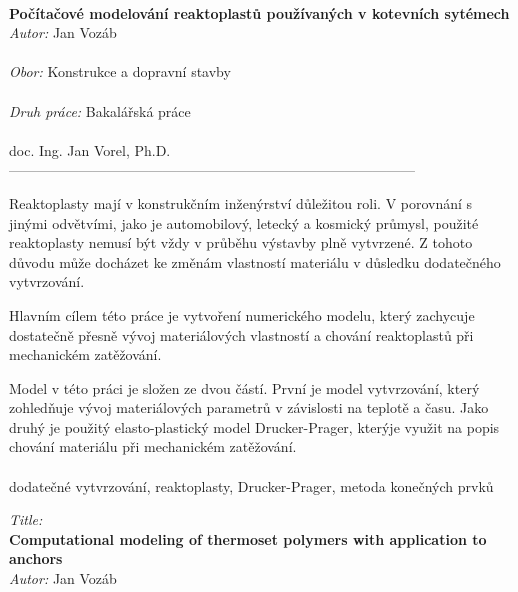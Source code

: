\thispagestyle{empty}

\\
{\bf Počítačové modelování reaktoplastů používaných v kotevních sytémech}\\

\noindent
{\it Autor:} Jan Vozáb  \\
\\
\noindent
{\it Obor:}       Konstrukce a dopravní stavby\\
\\
\noindent
{\it Druh práce:} Bakalářská práce\\
\\
 doc. Ing. Jan Vorel, Ph.D.\\   --------------------------------------------------------------------------------------- \\


Reaktoplasty mají v konstrukčním inženýrství důležitou roli. V porovnání s jinými odvětvími, jako je automobilový, letecký a kosmický průmysl, použité reaktoplasty nemusí být vždy v průběhu výstavby plně vytvrzené. Z tohoto důvodu může docházet ke změnám vlastností materiálu v důsledku dodatečného vytvrzování. 

Hlavním cílem této práce je vytvoření numerického modelu, který zachycuje dostatečně přesně vývoj materiálových vlastností a chování reaktoplastů při mechanickém zatěžování. 

Model v této práci je složen ze dvou částí. První je model vytvrzování, který zohledňuje vývoj materiálových parametrů v závislosti na teplotě a času. Jako druhý je použitý elasto-plastický model Drucker-Prager, kterýje využit na popis chování materiálu při mechanickém zatěžování.
\\
\\

 dodatečné vytvrzování, reaktoplasty, Drucker-Prager, metoda konečných prvků

 \newpage
\thispagestyle{empty}
 \noindent
{\it Title:}\\
{\bf Computational modeling of thermoset polymers with application to anchors}\\

\noindent
{\it Autor:} Jan Vozáb \\
 
